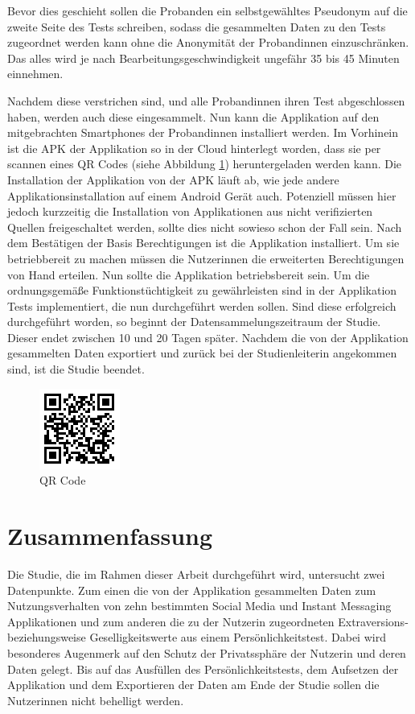 Bevor dies geschieht sollen die Probanden ein selbstgewähltes Pseudonym auf die zweite Seite des Tests schreiben, sodass die gesammelten Daten zu den Tests zugeordnet werden kann ohne die Anonymität der Probandinnen einzuschränken.
Das alles wird je nach Bearbeitungsgeschwindigkeit ungefähr 35 bis 45 Minuten einnehmen.
\par
Nachdem diese verstrichen sind, und alle Probandinnen ihren Test abgeschlossen haben, werden auch diese eingesammelt.
Nun kann die Applikation auf den mitgebrachten Smartphones der Probandinnen installiert werden.
Im Vorhinein ist die APK der Applikation so in der Cloud hinterlegt worden, dass sie per scannen eines QR Codes (siehe Abbildung \ref{fig:qrcode}) heruntergeladen werden kann.
Die Installation der Applikation von der APK läuft ab, wie jede andere Applikationsinstallation auf einem Android Gerät auch.
Potenziell müssen hier jedoch kurzzeitig die Installation von Applikationen aus nicht verifizierten Quellen freigeschaltet werden, sollte dies nicht sowieso schon der Fall sein.
Nach dem Bestätigen der Basis Berechtigungen ist die Applikation installiert.
Um sie betriebbereit zu machen müssen die Nutzerinnen die erweiterten Berechtigungen von Hand erteilen.
Nun sollte die Applikation betriebsbereit sein.
Um die ordnungsgemäße Funktionstüchtigkeit zu gewährleisten sind in der Applikation Tests implementiert, die nun durchgeführt werden sollen.
Sind diese erfolgreich durchgeführt worden, so beginnt der Datensammelungszeitraum der Studie.
Dieser endet zwischen 10 und 20 Tagen später.
Nachdem die von der Applikation gesammelten Daten exportiert und zurück bei der Studienleiterin angekommen sind, 
ist die Studie beendet.

\begin{figure}[h]
    \centering
    \includegraphics{images/qrcode.png}
    \caption{QR Code}
    \label{fig:qrcode}
\end{figure}


\section{Zusammenfassung}
\label{ch:Entwurf:sec:zusammenfassung}

Die Studie, die im Rahmen dieser Arbeit durchgeführt wird, untersucht zwei Datenpunkte.
Zum einen die von der Applikation gesammelten Daten zum Nutzungsverhalten von zehn bestimmten Social Media und Instant Messaging Applikationen
und zum anderen die zu der Nutzerin zugeordneten Extraversions- beziehungsweise Geselligkeitswerte aus einem Persönlichkeitstest.
Dabei wird besonderes Augenmerk auf den Schutz der Privatssphäre der Nutzerin und deren Daten gelegt.
Bis auf das Ausfüllen des Persönlichkeitstests, dem Aufsetzen der Applikation und dem Exportieren der Daten am Ende der Studie sollen die Nutzerinnen nicht behelligt werden.



